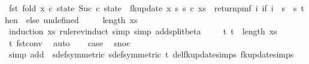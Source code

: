 \begin{isabellebody}
\ {\isachardoublequoteopen}fst\ {\isacharparenleft}{\kern0pt}fold\ {\isacharparenleft}{\kern0pt}{\isasymlambda}x\ {\isacharparenleft}{\kern0pt}c{\isacharcomma}{\kern0pt}\ state{\isacharparenright}{\kern0pt}{\isachardot}{\kern0pt}\ {\isacharparenleft}{\kern0pt}Suc\ c{\isacharcomma}{\kern0pt}\ state\ {\isasymbind}\ fk{\isacharunderscore}{\kern0pt}update{\isacharprime}{\kern0pt}\ x\ s\ s\ c{\isacharparenright}{\kern0pt}{\isacharparenright}{\kern0pt}\ xs\ {\isacharparenleft}{\kern0pt}{}{\isacharcomma}{\kern0pt}\ return{\isacharunderscore}{\kern0pt}pmf\ {\isacharparenleft}{\kern0pt}{\isasymlambda}i{\isachardot}{\kern0pt}\ if\ i\ {\isasymin}\ {\isacharbraceleft}{\kern0pt}{}{\isachardot}{\kern0pt}{\isachardot}{\kern0pt}{\isacharless}{\kern0pt}s\ {\isasymtimes}\ {\isacharbraceleft}{\kern0pt}{}{\isachardot}{\kern0pt}{\isachardot}{\kern0pt}{\isacharless}{\kern0pt}s\ then\ {\isacharparenleft}{\kern0pt}{}{\isacharcomma}{\kern0pt}{}{\isacharparenright}{\kern0pt}\ else\ undefined{\isacharparenright}{\kern0pt}{\isacharparenright}{\kern0pt}{\isacharparenright}{\kern0pt}\isanewline
\ \ \ \ {\isacharequal}{\kern0pt}\ length\ xs{\isachardoublequoteclose}\isanewline
\ \ \ \ \isamarkupfalse%
\ {\isacharparenleft}{\kern0pt}induction\ xs\ rule{\isacharcolon}{\kern0pt}rev{\isacharunderscore}{\kern0pt}induct{\isacharcomma}{\kern0pt}\ simp{\isacharcomma}{\kern0pt}\ simp\ add{\isacharcolon}{\kern0pt}split{\isacharunderscore}{\kern0pt}beta{\isacharparenright}{\kern0pt}\ \isanewline
\ \ \isamarkupfalse%
\ t{}{\isacharcolon}{\kern0pt}\ {\isachardoublequoteopen}t{}\ {\isacharequal}{\kern0pt}\ length\ xs{\isachardoublequoteclose}\ \isamarkupfalse%
\ t\ fst{\isacharunderscore}{\kern0pt}conv\ \isamarkupfalse%
\ auto\isanewline
\isanewline
\ \ \isamarkupfalse%
\ {\isacharquery}{\kern0pt}case\ \isamarkupfalse%
\ snoc\isanewline
\ \ \ \ \isamarkupfalse%
\ {\isacharparenleft}{\kern0pt}simp\ add{\isacharcolon}{\kern0pt}\ \ sdef{\isacharbrackleft}{\kern0pt}symmetric{\isacharbrackright}{\kern0pt}\ sdef{\isacharbrackleft}{\kern0pt}symmetric{\isacharbrackright}{\kern0pt}\ t\ del{\isacharcolon}{\kern0pt}fk{\isacharunderscore}{\kern0pt}update{\isacharprime}{\kern0pt}{\isachardot}{\kern0pt}simps\ fk{\isacharunderscore}{\kern0pt}update{\isachardot}{\kern0pt}simps{\isacharparenright}{\kern0pt}\isanewline

\end{isabellebody}
